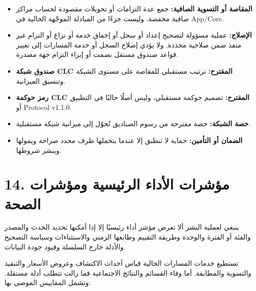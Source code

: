 \documentclass[11pt]{article}
\begin{document}
\begin{itemize}[leftmargin=*]
\item \textbf{المقاصة أو التسوية الصافية:} جمع عدة التزامات أو تحويلات مقصودة لحساب مراكز صافية مخفضة. وليست جزءًا من المبادلة الموجّهة الحالية في App/Core.
\item \textbf{الإصلاح:} عملية مسؤولة لتصحيح إعداد أو سجل أو إخفاق خدمة أو نزاع أو التزام غير منفذ ضمن صلاحية محددة. ولا يؤدي إصلاح السجل أو خدمة المسارات إلى تغيير قواعد صندوق مستقل بصمت أو إبراء التزام جهة مصدرة.
\item \textbf{صندوق شبكة CLC المقترح:} ترتيب مستقبلي للمقاصة على مستوى الشبكة وتنسيق الميزانية.
\item \textbf{رمز حوكمة CLC المقترح:} تصميم حوكمة مستقبلي، وليس أصلًا حاليًا في التطبيق أو Protocol v1.1.0.
\item \textbf{حصة الشبكة:} حصة مقترحة من رسوم الصناديق تُحوّل إلى ميزانية شبكة مستقبلية.
\item \textbf{الضمان أو التأمين:} حماية لا تنطبق إلا عندما يتحملها طرف محدد صراحة ويمولها وينشر شروطها.
\end{itemize}

\section*{14. مؤشرات الأداء الرئيسية ومؤشرات الصحة}

ينبغي لعملية النشر ألا تعرض مؤشر أداء رئيسيًا إلا إذا أمكنها تحديد الحدث والمصدر والفئة أو الفترة والوحدة وطريقة التقييم وطابعها الزمني والاستثناءات وسياسة التصحيح والأدلة خارج السلسلة وقيود جودة البيانات.

تستطيع خدمات المسارات الحالية قياس أحداث الاكتشاف وعروض الأسعار والتنفيذ والتسوية والمطابقة. أما وفاء القسائم والنتائج الاجتماعية فما زالت تتطلب أدلة مستقلة. وتشمل المقاييس الموصى بها:
\end{document}
